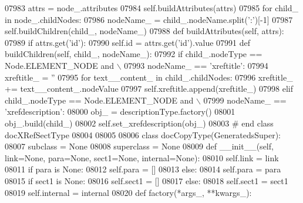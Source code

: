 \begin{DoxyCode}
{{{{{{{{{{{{{{{{{{{{{{{{{{{{{{{{{{{{{{{{{{{{{{{{{{{{{{{{{{{{{{{{{{{{{{{{{{{{{{{{{{{{{{{{{{{{{{{{{{{{{{{{{{{{{{{{{{{{{{{{{{{{{{{{{{{{{{{{{{{{{{{{{{{{{{{{{{{{{{{{{{{{{{{{{{{{{{{{{{{{{{{{{{{{{{{{{{{{{{{{{{{{{{{{{{{{{{{{{{{{{{{{{{{{{{{{{{{{{{{{{{{{{{{{{{{{{{{{{{{{{{{{{{{{{{{{{{{{{{{{{{{{{{{{{{{{{{{{{{{{{{{{{{{{{{{{{{{{{{{{{{{{{{{{{{{{{{{{{{{{{{{{{{{{{{{{{{{{{{{{{{{{{{{{{{{{{{{{{{{{{{{{{{{{{{{{{{{{{{{{{{{{{{{{{{{{{{{{{{{{{{{{{{{{{{{{{{{{{{{{{{{{{{{{{{{{{{{{{{{{{{{{{{{{{{{{{{{{{{{{{{{{{{{{{{{{07983         attrs = node\_.attributes
07984         self.buildAttributes(attrs)
07985         \textcolor{keywordflow}{for} child\_ \textcolor{keywordflow}{in} node\_.childNodes:
07986             nodeName\_ = child\_.nodeName.split(\textcolor{stringliteral}{':'})[-1]
07987             self.buildChildren(child\_, nodeName\_)
07988     \textcolor{keyword}{def }buildAttributes(self, attrs):
07989         \textcolor{keywordflow}{if} attrs.get(\textcolor{stringliteral}{'id'}):
07990             self.id = attrs.get(\textcolor{stringliteral}{'id'}).value
07991     \textcolor{keyword}{def }buildChildren(self, child\_, nodeName\_):
07992         \textcolor{keywordflow}{if} child\_.nodeType == Node.ELEMENT\_NODE \textcolor{keywordflow}{and} \(\backslash\)
07993             nodeName\_ == \textcolor{stringliteral}{'xreftitle'}:
07994             xreftitle\_ = \textcolor{stringliteral}{''}
07995             \textcolor{keywordflow}{for} text\_\_content\_ \textcolor{keywordflow}{in} child\_.childNodes:
07996                 xreftitle\_ += text\_\_content\_.nodeValue
07997             self.xreftitle.append(xreftitle\_)
07998         \textcolor{keywordflow}{elif} child\_.nodeType == Node.ELEMENT\_NODE \textcolor{keywordflow}{and} \(\backslash\)
07999             nodeName\_ == \textcolor{stringliteral}{'xrefdescription'}:
08000             obj\_ = descriptionType.factory()
08001             obj\_.build(child\_)
08002             self.set_xrefdescription(obj\_)
08003 \textcolor{comment}{# end class docXRefSectType}
08004 
08005 
08006 \textcolor{keyword}{class }docCopyType(GeneratedsSuper):
08007     subclass = \textcolor{keywordtype}{None}
08008     superclass = \textcolor{keywordtype}{None}
08009     \textcolor{keyword}{def }__init__(self, link=None, para=None, sect1=None, internal=None):
08010         self.link = link
08011         \textcolor{keywordflow}{if} para \textcolor{keywordflow}{is} \textcolor{keywordtype}{None}:
08012             self.para = []
08013         \textcolor{keywordflow}{else}:
08014             self.para = para
08015         \textcolor{keywordflow}{if} sect1 \textcolor{keywordflow}{is} \textcolor{keywordtype}{None}:
08016             self.sect1 = []
08017         \textcolor{keywordflow}{else}:
08018             self.sect1 = sect1
08019         self.internal = internal
08020     \textcolor{keyword}{def }factory(*args\_, **kwargs\_):
}}}}}}}}}}}}}}}}}}}}}}}}}}}}}}}}}}}}}}}}}}}}}}}}}}}}}}}}}}}}}}}}}}}}}}}}}}}}}}}}}}}}}}}}}}}}}}}}}}}}}}}}}}}}}}}}}}}}}}}}}}}}}}}}}}}}}}}}}}}}}}}}}}}}}}}}}}}}}}}}}}}}}}}}}}}}}}}}}}}}}}}}}}}}}}}}}}}}}}}}}}}}}}}}}}}}}}}}}}}}}}}}}}}}}}}}}}}}}}}}}}}}}}}}}}}}}}}}}}}}}}}}}}}}}}}}}}}}}}}}}}}}}}}}}}}}}}}}}}}}}}}}}}}}}}}}}}}}}}}}}}}}}}}}}}}}}}}}}}}}}}}}}}}}}}}}}}}}}}}}}}}}}}}}}}}}}}}}}}}}}}}}}}}}}}}}}}}}}}}}}}}}}}}}}}}}}}}}}}}}}}}}}}}}}}}}}}}}}}}}}}}}}}}}}}}}}}}}}}}}}}}}}}}}}}}}}}}}}}}}}}}}}}}}}}}}
\end{DoxyCode}
